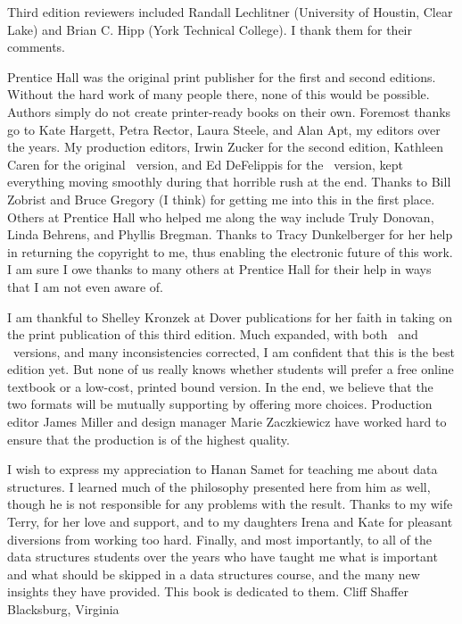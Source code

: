 Third edition reviewers included Randall Lechlitner (University of
Houstin, Clear Lake) and Brian C. Hipp (York Technical College).
I thank them for their comments.

Prentice Hall was the original print publisher for the first and
second editions.
Without the hard work of many people there, none of this
would be possible.
Authors simply do not create printer-ready books on their own.
Foremost thanks go to Kate Hargett, Petra Rector, Laura Steele, and
Alan Apt, my editors over the years.
My production editors, Irwin Zucker for the second edition,
Kathleen Caren for the original \LangCPP\ version,
and Ed DeFelippis for the \LangJava\ version,
kept everything moving smoothly during that horrible rush at the end.
Thanks to Bill Zobrist and Bruce Gregory (I think) for getting me
into this in the first place.
Others at Prentice Hall who helped me along the way include Truly
Donovan, Linda Behrens, and Phyllis Bregman.
Thanks to Tracy Dunkelberger for her help in returning the copyright
to me, thus enabling the electronic future of this work.
I am sure I owe thanks to many others at Prentice Hall for their
help in ways that I am not even aware of.

I am thankful to Shelley Kronzek at Dover publications for her faith
in taking on the print publication of this third edition.
Much expanded, with both \LangJava\ and \LangCPP\ versions, and many
inconsistencies corrected, I am confident that this is the best
edition yet.
But none of us really knows whether students will prefer a free online
textbook or a low-cost, printed bound version.
In the end, we believe that the two formats will be mutually
supporting by offering more choices.
Production editor James Miller and design manager Marie Zaczkiewicz
have worked hard to ensure that the production is of the highest
quality.

I wish to express my appreciation to Hanan Samet for teaching me about
data structures.
I learned much of the philosophy presented here from
him as well, though he is not 
responsible for any problems with the result.
Thanks to my wife Terry, for her love and support, and to my daughters 
Irena and Kate for pleasant diversions from working too hard.
Finally, and most importantly, to all of the data structures students
over the years who have taught me what is important and what should
be skipped in a data structures course, and the many new insights
they have provided.
This book is dedicated to them.
\bigskip
{\obeylines\parskip=0pt\parindent=0pt
\hfill Cliff Shaffer
\hfill Blacksburg, Virginia
}
